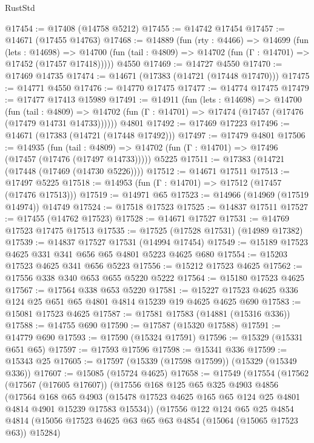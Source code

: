 \begin{lexlean}{RustStd}
\begin{coremodule}
@17454 := @17408 (@14758 @5212)
@17455 := @14742 @17454
@17457 := @14671 (@17455 @14763)
@17468 := @14889
    (fun (rty : @4466) =>
    @14699
      (fun (lets : @14698) =>
      @14700 (fun (tail : @4809) => @14702 (fun (Γ : @14701) => @17452 (@17457 @17418)))))
    @4550
@17469 := @14727 @4550
@17470 := @17469 @14735
@17474 := @14671 (@17383 (@14721 (@17448 @17470)))
@17475 := @14771 @4550
@17476 := @14770 @17475
@17477 := @14774 @17475
@17479 := @17477 @17413 @15989
@17491 := @14911
    (fun (lets : @14698) =>
    @14700
      (fun (tail : @4809) =>
      @14702 (fun (Γ : @14701) => @17474 (@17457 (@17476 (@17479 @14731 @14733))))))
    @4801
@17492 := @17469 @17223
@17496 := @14671 (@17383 (@14721 (@17448 @17492)))
@17497 := @17479 @4801
@17506 := @14935
    (fun (tail : @4809) => @14702 (fun (Γ : @14701) => @17496 (@17457 (@17476 (@17497 @14733)))))
    @5225
@17511 := @17383 (@14721 (@17448 (@17469 (@14730 @5226))))
@17512 := @14671 @17511
@17513 := @17497 @5225
@17518 := @14953 (fun (Γ : @14701) => @17512 (@17457 (@17476 @17513)))
@17519 := @14971 @65
@17523 := @14966 (@14969 (@17519 @14974)) @14749
@17524 := @17518 @17523
@17525 := @14837 @17511
@17527 := @17455 (@14762 @17523)
@17528 := @14671 @17527
@17531 := @14769 @17523 @17475 @17513
@17535 := @17525 (@17528 @17531) (@14989 @17382)
@17539 := @14837 @17527 @17531 (@14994 @17454)
@17549 := @15189 @17523 @4625 @331 @341 @656 @65 @4801 @5223 @4625 @680
@17554 := @15203 @17523 @4625 @341 @656 @5223
@17556 := @15212 @17523 @4625
@17562 := @17556 @338 @340 @653 @655 @5220 @5222
@17564 := @15180 @17523 @4625
@17567 := @17564 @338 @653 @5220
@17581 := @15227 @17523 @4625 @336 @124 @25 @651 @65 @4801 @4814 @15239 @19 @4625 @4625 @690
@17583 := @15081 @17523 @4625
@17587 := @17581 @17583 (@14881 (@15316 @336))
@17588 := @14755 @690
@17590 := @17587 (@15320 @17588)
@17591 := @14779 @690
@17593 := @17590 (@15324 @17591)
@17596 := @15329 (@15331 @651 @65)
@17597 := @17593 @17596
@17598 := @15341 @336
@17599 := @15343 @25
@17605 := @17597 (@15339 (@17598 @17599)) (@15329 (@15349 @336))
@17607 := @15085 (@15724 @4625)
@17658 := @17549
    (@17554
      (@17562
        (@17567 (@17605 @17607))
        (@17556
          @168
          @125
          @65
          @325
          @4903
          @4856
          (@17564
            @168
            @65
            @4903
            (@15478 @17523 @4625 @165 @65 @124 @25 @4801 @4814 @4901 @15239 @17583 @15534))
          (@17556
            @122
            @124
            @65
            @25
            @4854
            @4814
            (@15056 @17523 @4625 @63 @65 @63 @4854 (@15064 (@15065 @17523 @63)) @15284)

\end{coremodule}
\end{lexlean}
